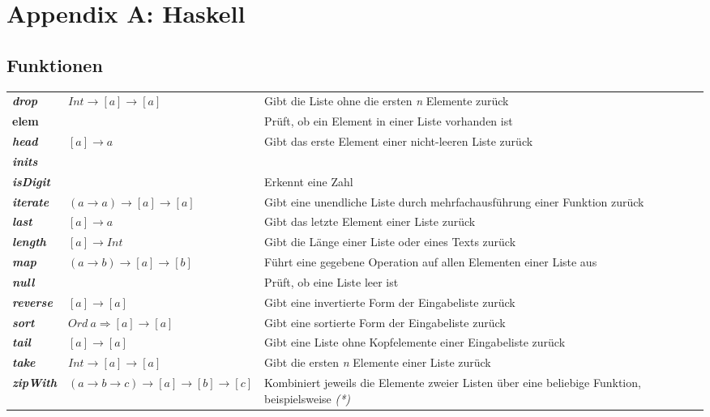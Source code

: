 \section{Appendix A: Haskell}

\subsection{Funktionen}
\begin{table}[H]
\begin{tabularx}{\textwidth}{l|X|X}
	\textbf{\textit{drop}} & \(Int \rightarrow [a] \rightarrow [a]\) & Gibt die Liste ohne die ersten \textit{n} Elemente zurück \\
	\textbf{elem} & & Prüft, ob ein Element in einer Liste vorhanden ist \\
	\textbf{\textit{head}} & \([a] \rightarrow a\) & Gibt das erste Element einer nicht-leeren Liste zurück \\
	\textbf{\textit{inits}} & & \\
	\textbf{\textit{isDigit}} & & Erkennt eine Zahl \\
	\textbf{\textit{iterate}} & \((a \rightarrow a) \rightarrow [a] \rightarrow [a]\) & Gibt eine unendliche Liste durch mehrfachausführung einer Funktion zurück \\
	\textbf{\textit{last}} & \([a] \rightarrow a\) & Gibt das letzte Element einer Liste zurück \\
	\textbf{\textit{length}} & \([a] \rightarrow Int\) & Gibt die Länge einer Liste oder eines Texts zurück \\
	\textbf{\textit{map}} & \((a \rightarrow b) \rightarrow [a] \rightarrow [b]\) & Führt eine gegebene Operation auf allen Elementen einer Liste aus \\
	\textbf{\textit{null}} & & Prüft, ob eine Liste leer ist \\
	\textbf{\textit{reverse}} & \([a] \rightarrow [a]\) & Gibt eine invertierte Form der Eingabeliste zurück \\
	\textbf{\textit{sort}} & \(Ord~a \Rightarrow [a] \rightarrow [a]\) & Gibt eine sortierte Form der Eingabeliste zurück \\
	\textbf{\textit{tail}} & \([a] \rightarrow [a]\) & Gibt eine Liste ohne Kopfelemente einer Eingabeliste zurück \\
	\textbf{\textit{take}} & \(Int \rightarrow [a] \rightarrow [a]\) & Gibt die ersten \textit{n} Elemente einer Liste zurück \\
	\textbf{\textit{zipWith}} & \((a \rightarrow b \rightarrow c) \rightarrow [a] \rightarrow [b] \rightarrow [c]\) & Kombiniert jeweils die Elemente zweier Listen über eine beliebige Funktion, beispielsweise \textit{(*)} \\
\end{tabularx}
\end{table}


